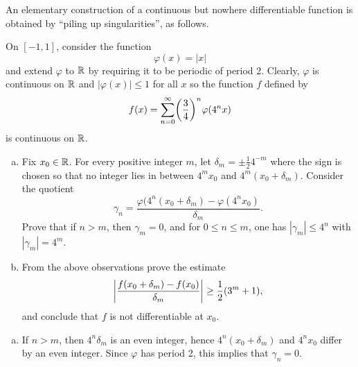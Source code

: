 \begin{pb}[4]
    An elementary construction of a continuous but nowhere differentiable function
    is obtained by ``piling up singularities'', as follows.

    On \([-1, 1]\), consider the function
    \begin{equation*}
        \varphi(x) = |x|
    \end{equation*}
    and extend \(\varphi\) to \(\mathbb{R}\) by requiring it to be periodic of period 2.
    Clearly, \(\varphi\) is continuous on \(\mathbb{R}\) and \(|\varphi(x)| \leq 1\) for all \(x\)
    so the function \(f\) defined by
    \begin{equation*}
        f(x) = \sum_{n = 0}^{\infty} \lrb{\frac{3}{4}}^n \varphi(4^nx)
    \end{equation*}
    is continuous on \(\mathbb{R}\).

    \begin{enumerate}[(a)]
    \item
        Fix \(x_0 \in \mathbb{R}\).
        For every positive integer \(m\), let \(\delta_m = \pm \frac{1}{2} 4^{-m}\)
        where the sign is chosen so that no integer lies in between \(4^m x_0\) and \(4^m(x_0 + \delta_m)\).
        Consider the quotient
        \begin{equation*}
            \gamma_n = \frac{\varphi(4^n(x_0 + \delta_m) - \varphi(4^n x_0)}{\delta_m}.
        \end{equation*}
        Prove that if \(n > m\), then \(\gamma_m = 0\),
        and for \(0 \leq n \leq m\), one has \(|\gamma_m| \leq 4^n\) with \(|\gamma_m| = 4^m\).

    \item
        From the above observations prove the estimate
        \begin{equation*}
            \abs{\frac{f(x_0 + \delta_m) - f(x_0)}{\delta_m}} \geq \frac{1}{2} (3^m + 1),
        \end{equation*}
        and conclude that \(f\) is not differentiable at \(x_0\).

    \end{enumerate}

\begin{soln}
    \begin{enumerate}[(a)]
    \item
        If \(n > m\), then \(4^n \delta_m\) is an even integer,
        hence \(4^n(x_0 + \delta_m)\) and \(4^n x_0\) differ
        by an even integer.
        Since \(\varphi\) has period 2, this implies that \(\gamma_n = 0\).


\end{enumerate}
\end{soln}
\end{pb}
